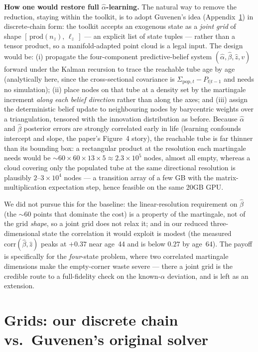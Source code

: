 \documentclass[11pt,fleqn]{article}
\begin{document}
\textbf{How one would restore full $\hat\alpha$-learning.} The natural way to remove the
reduction, staying within the toolkit, is to adopt Guvenen's idea
(Appendix~\ref{app:grids}) in discrete-chain form: the toolkit accepts an exogenous state
as a \emph{joint grid} of shape $[\,\mathrm{prod}(n_z),\,\ell_z\,]$ --- an explicit list
of state tuples --- rather than a tensor product, so a manifold-adapted point cloud is a
legal input. The design would be: (i) propagate the four-component predictive-belief
system $(\hat\alpha,\hat\beta,\hat z,v)$ forward under the Kalman recursion to trace the
reachable tube age by age (analytically here, since the cross-sectional covariance is
$\Sigma_{\text{pop},t}-P_{t|t-1}$ and needs no simulation); (ii) place nodes on that tube
at a density set by the martingale increment \emph{along each belief direction} rather
than along the axes; and (iii) assign the deterministic belief update to neighbouring
nodes by barycentric weights over a triangulation, tensored with the innovation
distribution as before. Because $\hat\alpha$ and $\hat\beta$ posterior errors are strongly
correlated early in life (learning confounds intercept and slope, the paper's Figure~4
story), the reachable tube is far thinner than its bounding box: a rectangular product at
the resolution each martingale needs would be
$\sim\!60\times60\times13\times5\approx2.3\times10^5$ nodes, almost all empty, whereas a
cloud covering only the populated tube at the same directional resolution is plausibly
$2\text{--}3\times10^4$ nodes --- a transition array of a few GB with the
matrix-multiplication expectation step, hence feasible on the same 20GB GPU.

We did not pursue this for the baseline: the linear-resolution requirement on $\hat\beta$
(the $\sim$60 points that dominate the cost) is a property of the martingale, not of the
grid \emph{shape}, so a joint grid does not relax it; and in our reduced
three-dimensional state the correlation it would exploit is modest (the measured
$\mathrm{corr}(\hat\beta,\hat z)$ peaks at $+0.37$ near age~44 and is below $0.27$ by
age~64). The payoff is specifically for the \emph{four}-state problem, where two
correlated martingale dimensions make the empty-corner waste severe --- there a joint
grid is the credible route to a full-fidelity check on the known-$\alpha$ deviation, and
is left as an extension.

\section{Grids: our discrete chain vs.\ Guvenen's original solver}
\label{app:grids}
\end{document}
